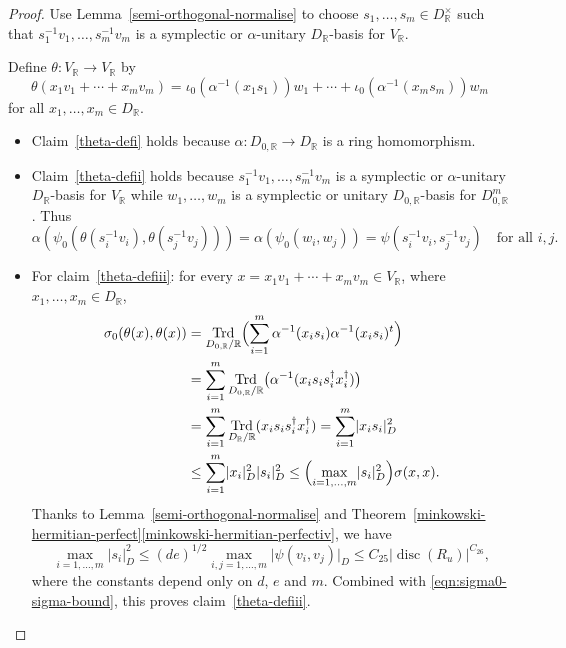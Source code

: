 \documentclass[JEP,XML,SOM,Unicode,NoFloatCountersInSection]{cedram}
\newcommand{\bR}{\mathbb{R}}
\DeclareMathOperator{\disc}{disc}
\DeclareMathOperator{\Trd}{Trd}
\newcommand{\abs}[1]{\lvert #1 \rvert}
\begin{document}
\begin{proof}
Use Lemma~\ref{semi-orthogonal-normalise} to choose $s_1, \dotsc, s_m \in D_\bR^\times$ such that $s_1^{-1} v_1, \dotsc, s_m^{-1} v_m$ is a symplectic or $\alpha$-unitary $D_\bR$-basis for $V_\bR$.

Define $\theta \colon V_\bR \to V_\bR$ by
\[
\theta(x_1v_1 + \dotsb + x_mv_m) = \iota_0(\alpha^{-1}(x_1 s_1))w_1 + \dotsb + \iota_0(\alpha^{-1}(x_m s_m))w_m
\]
for all $x_1, \dotsc, x_m \in D_\bR$.

\begin{itemize}
\item
Claim~\eqref{theta-defi} holds because $\alpha \colon D_{0,\bR} \to D_\bR$ is a ring homomorphism.

\item
Claim~\eqref{theta-defii} holds because $s_1^{-1} v_1, \dotsc, s_m^{-1} v_m$ is a symplectic or $\alpha$-unitary $D_\bR$-basis for $V_\bR$ while $w_1, \dotsc, w_m$ is a symplectic or unitary $D_{0,\bR}$-basis for $D_{0,\bR}^m$.
Thus
\[
\alpha(\psi_0(\theta(s_i^{-1} v_i), \theta(s_j^{-1} v_j))) = \alpha(\psi_0(w_i, w_j)) = \psi(s_i^{-1} v_i, s_j^{-1} v_j) \quad\text{for all } i, j.
\]

\item
For claim~\eqref{theta-defiii}: for every $x = x_1v_1 + \dotsb + x_mv_m \in V_\bR$, where $x_1, \dotsc, x_m \in D_\bR$,
\begin{equation}\label{eqn:sigma0-sigma-bound}
\begin{aligned}
\sigma_0(\theta(x), \theta(x))
& = \Trd_{D_{0,\bR}/\bR} \Bigl( \sum_{i=1}^m \alpha^{-1}(x_is_i) \alpha^{-1}(x_is_i)^t \Bigr)
\\& = \sum_{i=1}^m \Trd_{D_{0,\bR}/\bR} \bigl( \alpha^{-1}(x_is_i s_i^\dag x_i^\dag) \bigr)
\\& = \sum_{i=1}^m \Trd_{D_\bR/\bR}(x_is_i s_i^\dag x_i^\dag)
= \sum_{i=1}^m \abs{x_is_i}_D^2
\\& \leq \sum_{i=1}^m \abs{x_i}_D^2 \abs{s_i}_D^2
\leq \Bigl( \max_{i=1,\dotsc,m} \abs{s_i}_D^2 \Bigr) \sigma(x, x).
\end{aligned}
\end{equation}
Thanks to Lemma~\ref{semi-orthogonal-normalise} and Theorem~\ref{minkowski-hermitian-perfect}\eqref{minkowski-hermitian-perfectiv}, we have
\[
\max_{i=1, \dotsc, m} \abs{s_i}_D^2
\leq (de)^{1/2} \max_{i,j = 1, \dotsc, m} \abs{\psi(v_i, v_j)}_D
\leq C_{25} \abs{\disc(R_u)}^{C_{26}},
\]
where the constants depend only on $d$, $e$ and $m$.
Combined with \eqref{eqn:sigma0-sigma-bound}, this proves claim~\eqref{theta-defiii}.\qedhere
\end{itemize}
\end{proof}
\end{document}
